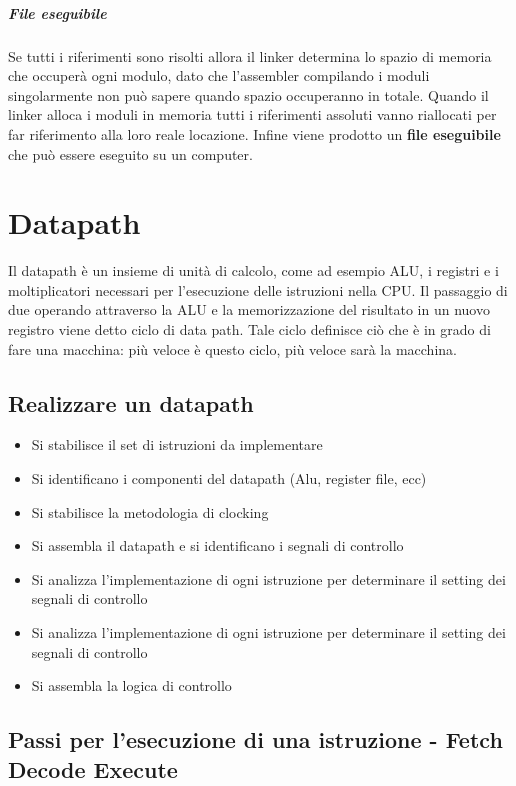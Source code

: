 \documentclass[12pt, a4paper, openany]{book}
\begin{document}
\paragraph*{File eseguibile} Se tutti i riferimenti sono risolti allora il linker determina
lo spazio di memoria che occuperà ogni modulo, dato che l'assembler compilando i moduli
singolarmente non può sapere quando spazio occuperanno in totale. Quando il linker
alloca i moduli in memoria tutti i riferimenti assoluti vanno riallocati per far riferimento
alla loro reale locazione.
Infine viene prodotto un \textbf{file eseguibile} che può essere eseguito su un computer.

\chapter{Datapath}
Il datapath è un insieme di unità di calcolo, come ad esempio
ALU, i registri e i moltiplicatori necessari per l'esecuzione delle istruzioni nella
CPU.
Il passaggio di due operando attraverso la ALU e la memorizzazione del risultato in un
nuovo registro viene detto ciclo di data path. Tale ciclo definisce ciò che è in grado
di fare una macchina: più veloce è questo ciclo, più veloce sarà la macchina.

\section{Realizzare un datapath}
\begin{itemize}
    \item Si stabilisce il set di istruzioni da implementare
    \item Si identificano i componenti del datapath (Alu, register file, ecc)
    \item Si stabilisce la metodologia di clocking
    \item Si assembla il datapath e si identificano i segnali di controllo
    \item Si analizza l'implementazione di ogni istruzione per determinare il setting
    dei segnali di controllo
    \item Si analizza l'implementazione di ogni istruzione per determinare il setting
    dei segnali di controllo
    \item Si assembla la logica di controllo
\end{itemize}

\section{Passi per l'esecuzione di una istruzione - Fetch Decode Execute}
\end{document}
